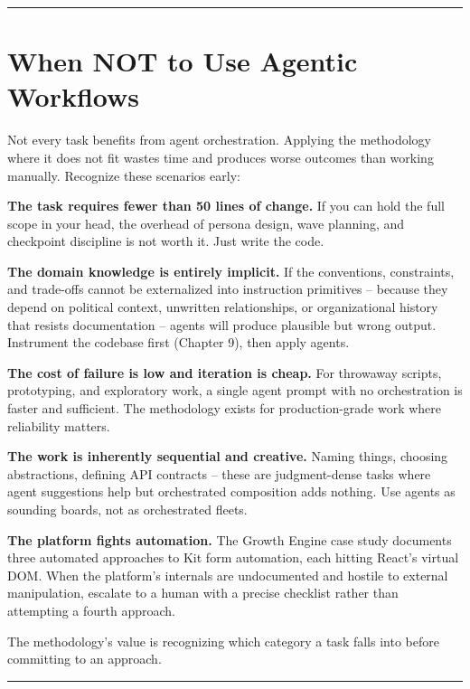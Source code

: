 \documentclass[
  a4paper,
  DIV=11,
  numbers=noendperiod]{scrreprt}
\begin{document}
\begin{center}\rule{0.5\linewidth}{0.5pt}\end{center}

\section{When NOT to Use Agentic
Workflows}\label{when-not-to-use-agentic-workflows}

Not every task benefits from agent orchestration. Applying the
methodology where it does not fit wastes time and produces worse
outcomes than working manually. Recognize these scenarios early:

\textbf{The task requires fewer than 50 lines of change.} If you can
hold the full scope in your head, the overhead of persona design, wave
planning, and checkpoint discipline is not worth it. Just write the
code.

\textbf{The domain knowledge is entirely implicit.} If the conventions,
constraints, and trade-offs cannot be externalized into instruction
primitives -- because they depend on political context, unwritten
relationships, or organizational history that resists documentation --
agents will produce plausible but wrong output. Instrument the codebase
first (Chapter 9), then apply agents.

\textbf{The cost of failure is low and iteration is cheap.} For
throwaway scripts, prototyping, and exploratory work, a single agent
prompt with no orchestration is faster and sufficient. The methodology
exists for production-grade work where reliability matters.

\textbf{The work is inherently sequential and creative.} Naming things,
choosing abstractions, defining API contracts -- these are
judgment-dense tasks where agent suggestions help but orchestrated
composition adds nothing. Use agents as sounding boards, not as
orchestrated fleets.

\textbf{The platform fights automation.} The Growth Engine case study
documents three automated approaches to Kit form automation, each
hitting React's virtual DOM. When the platform's internals are
undocumented and hostile to external manipulation, escalate to a human
with a precise checklist rather than attempting a fourth approach.

The methodology's value is recognizing which category a task falls into
before committing to an approach.

\begin{center}\rule{0.5\linewidth}{0.5pt}\end{center}
\end{document}
